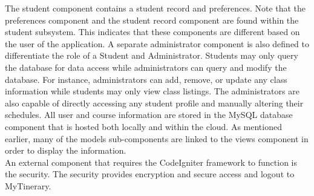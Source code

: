 \documentclass{article}
\begin{document}
The student component contains a student record and preferences. Note that the preferences component and the student record component are found within the student subsystem. This indicates that these components are different based on the user of the application. A separate administrator component is also defined to differentiate the role of a Student and Administrator. Students may only query the database for data access while administrators can query and modify the database. For instance, administrators can add, remove, or update any class information while students may only view class listings. The administrators are also capable of directly accessing any student profile and manually altering their schedules. All user and course information are stored in the MySQL database component that is hosted both locally and within the cloud. As mentioned earlier, many of the models sub-components are linked to the views component in order to display the information.\\

An external component that requires the CodeIgniter framework to function is the security. The security provides encryption and secure access and logout to MyTinerary. \\
\end{document}
